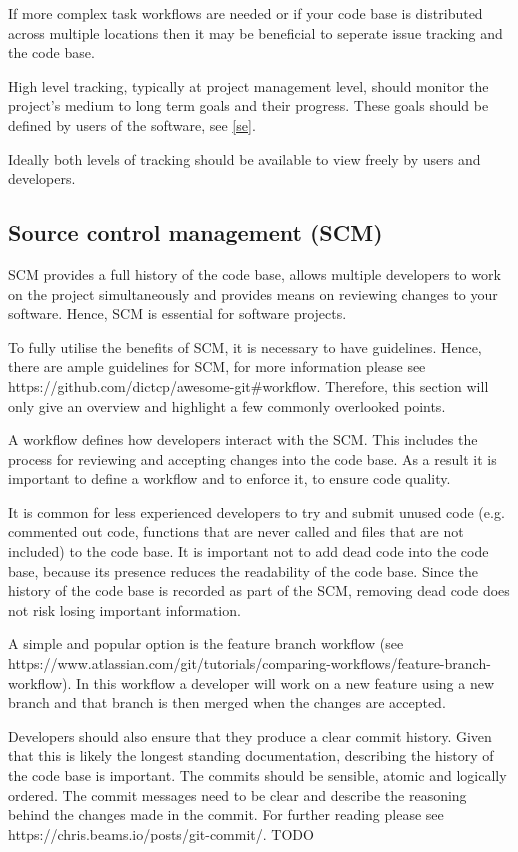 \documentclass[jnr]{iosart2x}
\begin{document}
If more complex task workflows are needed or if your code base is distributed across multiple locations then it may be beneficial to seperate issue tracking and the code base.

High level tracking, typically at project management level, should monitor the project's medium to long term goals and their progress.
These goals should be defined by users of the software, see \ref{se}.

Ideally both levels of tracking should be available to view freely by users and developers.

\subsection{Source control management (SCM)}
\label{Source control management}

SCM provides a full history of the code base, allows multiple developers to work on the project simultaneously and provides means on reviewing changes to your software. Hence, SCM is essential for software projects.

To fully utilise the benefits of SCM, it is necessary to have guidelines. 
Hence, there are ample guidelines for SCM, for more information please see https://github.com/dictcp/awesome-git\#workflow. Therefore, this section will only give an overview and highlight a few commonly overlooked points.

A workflow defines how developers interact with the SCM. 
This includes the process for reviewing and accepting changes into the code base. 
As a result it is important to define a workflow and to enforce it, to ensure code quality.

It is common for less experienced developers to try and submit unused code (e.g. commented out code, functions that are never called and files that are not included) to the code base.
It is important not to add dead code into the code base, because 
its presence reduces the readability of the code base. 
Since the history of the code base is recorded as part of the SCM, removing dead code does not risk losing important information.

A simple and popular option is the feature branch workflow (see https://www.atlassian.com/git/tutorials/comparing-workflows/feature-branch-workflow).
In this workflow a developer will work on a new feature using a new branch and that branch is then merged when the changes are accepted.

Developers should also ensure that they produce a clear commit history.
Given that this is likely the longest standing documentation, describing the history of the code base is important. 
The commits should be sensible, atomic and logically ordered. The commit messages need to be clear and describe the reasoning behind the changes made in the commit.
For further reading please see https://chris.beams.io/posts/git-commit/. TODO
\end{document}
